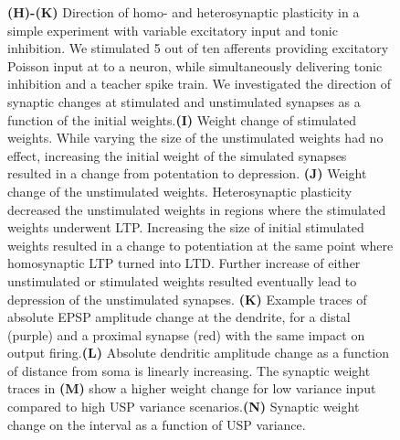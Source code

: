 \documentclass[twocolumn,12pt]{article}
\begin{document}
\begin{figure}
{{\bf(H)-(K)} Direction of homo- and heterosynaptic plasticity in a simple experiment with variable excitatory input and tonic inhibition. We stimulated \num{5} out of ten afferents providing excitatory Poisson input at to a neuron, while simultaneously delivering tonic inhibition and a teacher spike train. We investigated the direction of synaptic changes at stimulated and unstimulated synapses as a function of the initial weights.{\bf (I)} Weight change of stimulated weights. While varying the size of the unstimulated weights had no effect, increasing the initial weight of the simulated synapses resulted in a change from potentation to depression. {\bf (J)} Weight change of the unstimulated weights. Heterosynaptic plasticity decreased the unstimulated weights in regions where the stimulated weights underwent LTP. Increasing the size of initial stimulated weights resulted in a change to potentiation at the same point where homosynaptic LTP turned into LTD. Further increase of either unstimulated or stimulated weights resulted eventually lead to depression of the unstimulated synapses. {\bf(K)} Example traces of absolute EPSP amplitude change at the dendrite, for a distal (purple) and a proximal synapse (red) with the same impact on output firing.{\bf(L)} Absolute dendritic amplitude change as a function of distance from soma is linearly increasing. The synaptic weight traces in {\bf(M)} show a higher weight change for low variance input compared to high USP variance scenarios.{\bf(N)} Synaptic weight change on the interval as a function of USP variance.}
\end{figure}
\end{document}
